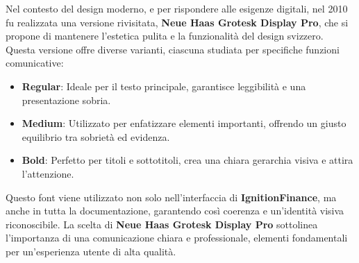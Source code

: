 \noindent Nel contesto del design moderno, e per rispondere alle esigenze digitali, nel 2010 fu realizzata una versione rivisitata, \textbf{Neue Haas Grotesk Display Pro}, che si propone di mantenere l'estetica pulita e la funzionalità del design svizzero.
Questa versione offre diverse varianti, ciascuna studiata per specifiche funzioni comunicative:
\begin{itemize}
    \item \textbf{Regular}: Ideale per il testo principale, garantisce leggibilità e una presentazione sobria.
    \item \textbf{Medium}: Utilizzato per enfatizzare elementi importanti, offrendo un giusto equilibrio tra sobrietà ed evidenza.
    \item \textbf{Bold}: Perfetto per titoli e sottotitoli, crea una chiara gerarchia visiva e attira l'attenzione.
\end{itemize}

\noindent Questo font viene utilizzato non solo nell'interfaccia di \textbf{IgnitionFinance}, ma anche in tutta la documentazione, garantendo così coerenza e un'identità visiva riconoscibile.
La scelta di \textbf{Neue Haas Grotesk Display Pro} sottolinea l'importanza di una comunicazione chiara e professionale, elementi fondamentali per un'esperienza utente di alta qualità.

\vspace{\baselineskip}

